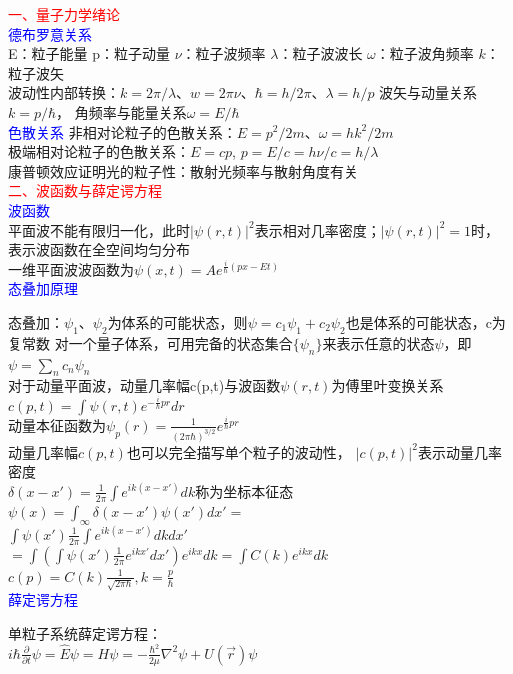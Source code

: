 \documentclass[a4paper,8pt]{extarticle} %
\newcommand{\bluetext}[1]{\textcolor{blue}{#1}}
\newcommand{\redtext}[1]{\textcolor{red}{#1}}
\begin{document}
\begin{multicols}{3}

\redtext{一、量子力学绪论}\\
\bluetext{德布罗意关系}\\
E：粒子能量 p：粒子动量 $\nu$：粒子波频率 $\lambda$：粒子波波长 $\omega$：粒子波角频率 $k$：粒子波矢\\
波动性内部转换：$k=2\pi/\lambda$、$w=2\pi\nu$、$\hbar=h/2\pi$、$\lambda=h/p$
波矢与动量关系$k=p/\hbar$，
角频率与能量关系$\omega=E/\hbar$ \\
\bluetext{色散关系}
非相对论粒子的色散关系：$E = p^2/2m$、$\omega=hk^2/2m$\\
极端相对论粒子的色散关系：$E = cp$,
$p=E/c=h\nu/c=h/\lambda$\\
康普顿效应证明光的粒子性：散射光频率与散射角度有关\\
\redtext{二、波函数与薛定谔方程}\\
\bluetext{波函数}\\
平面波不能有限归一化，此时$|\psi(r, t)|^2$表示相对几率密度；$|\psi(r, t)|^2 = 1$时，表示波函数在全空间均匀分布\\
一维平面波波函数为$\psi(x, t) = Ae^{\frac{i}{\hbar}(px-E t)}$\\
\bluetext{态叠加原理}

态叠加：$\psi_1、\psi_2$为体系的可能状态，则$\psi=c_1\psi_1+c_2\psi_2$也是体系的可能状态，c为复常数
对一个量子体系，可用完备的状态集合${\{\psi_n\}}$来表示任意的状态$\psi$，即$\psi=\sum_n c_n\psi_n$\\
对于动量平面波，动量几率幅c(p,t)与波函数$\psi(r,t)$为傅里叶变换关系$c(p,t)=\int\psi(r,t)e^{-\frac{i}{\hbar}pr}dr$\\
动量本征函数为$\psi_p(r)=\frac{1}{(2\pi\hbar)^{3/2}}e^{\frac{i}{\hbar}pr}$\\
动量几率幅$c(p,t)$也可以完全描写单个粒子的波动性， $|c(p,t)|^2$表示动量几率密度\\
$\delta(x-x')=\frac{1}{2\pi}\int e^{ik(x-x')}dk$称为坐标本征态\\
$\psi(x)=\int_\infty\delta(x-x')\psi(x')dx'= $ \\ $\int\psi(x')\frac{1}{2\pi}\int e^{ik(x-x')}dkdx'$\\
$ = \int(\int\psi(x')\frac{1}{2\pi}e^{ikx'}dx')e^{ikx}dk=\int C(k)e^{ikx}dk $\\
$c(p)=C(k)\frac{1}{\sqrt{2\pi\hbar}}, k=\frac{p}{\hbar}$\\
\bluetext{薛定谔方程}

单粒子系统薛定谔方程：\\$i\hbar\frac{\partial}{\partial t}\psi = \hat{E}\psi = H\psi = -\frac{\hbar^2}{2\mu}\nabla^2\psi + U(\vec{r})\psi$ 
 

\end{multicols}
\end{document}
